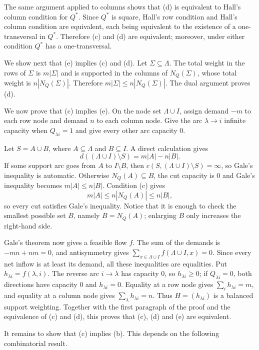 \documentclass[11pt]{article}
\theoremstyle{plain}
\theoremstyle{remark}
\theoremstyle{definition}
\theoremstyle{plain}
\begin{document}
The same argument applied to columns shows that (d) is equivalent to Hall's
column condition for $Q^*$. Since $Q^*$ is square, Hall's row condition and
Hall's column condition are equivalent, each being equivalent to the existence
of a one-transversal in $Q^*$. Therefore (c) and (d) are equivalent; moreover,
under either condition $Q^*$ has a one-transversal.

\begingroup
We {show next} that (e) implies (c) and (d). Let
$\Sigma\subseteq\Lambda$. The total weight in the rows of $\Sigma$ is
$m|\Sigma|$ and is supported in the columns of $N_Q(\Sigma)$, whose total
weight is $n|N_Q(\Sigma)|$. Therefore
$m|\Sigma|\le n|N_Q(\Sigma)|$. The dual argument proves (d).

We now prove that (c) implies (e). On the node set
$\Lambda\cup I$, assign demand $-m$ to each row node and demand $n$ to each
column node. Give the arc $\lambda\to i$ infinite capacity when
$Q_{\lambda i}=1$ and give every other arc capacity $0$.

Let $S=A\cup B$, where $A\subseteq\Lambda$ and $B\subseteq I$. A direct
calculation gives
\[
        d((\Lambda\cup I)\setminus S)=m|A|-n|B|.
\]
If some support arc goes from $A$ to $I\setminus B$, then
$c(S,(\Lambda\cup I)\setminus S)=\infty$, so Gale's inequality is
automatic. Otherwise $N_Q(A)\subseteq B$, the cut capacity is $0$ and Gale's
inequality becomes $m|A|\le n|B|$. Condition (c) gives
\[
        m|A|\le n|N_Q(A)|\le n|B|,
\]
so every cut satisfies Gale's inequality. Notice that it is enough to check
the smallest possible set $B$, namely $B=N_Q(A)$; enlarging $B$ only
increases the right-hand side.

Gale's theorem now gives a feasible flow $f$. The sum of the demands is
$-mn+nm=0$, and antisymmetry gives
$\sum_{x\in\Lambda\cup I}f(\Lambda\cup I,x)=0$. Since every net inflow is
at least its demand, all these inequalities are equalities. Put
$h_{\lambda i}=f(\lambda,i)$. The reverse arc $i\to\lambda$ has capacity
$0$, so $h_{\lambda i}\ge0$; if $Q_{\lambda i}=0$, both directions have
capacity $0$ and $h_{\lambda i}=0$. Equality at a row node gives
$\sum_i h_{\lambda i}=m$, and equality at a column node gives
$\sum_\lambda h_{\lambda i}=n$. Thus $H=(h_{\lambda i})$ is a balanced
support weighting. Together with the first paragraph of the proof and the
equivalence of (c) and (d), this proves that (c), (d) and (e) are
equivalent.
\endgroup

It remains to show that (c) implies (b).
This depends on the following
combinatorial result.
\end{document}
